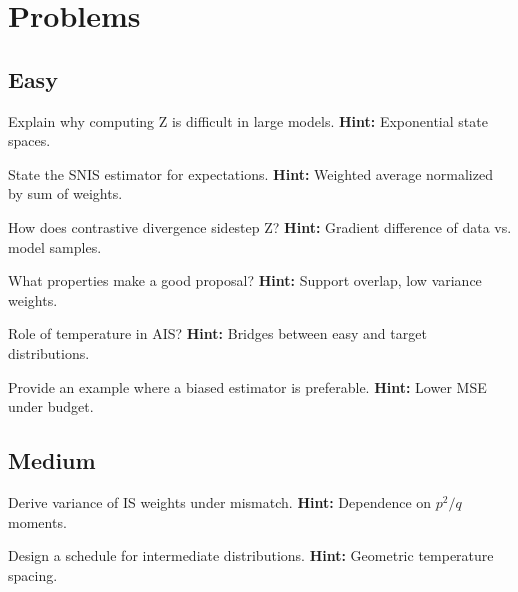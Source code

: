 
\section*{Problems}

\subsection*{Easy}
\begin{problem}
Explain why computing Z is difficult in large models.
\textbf{Hint:} Exponential state spaces.
\end{problem}

\begin{problem}
State the SNIS estimator for expectations.
\textbf{Hint:} Weighted average normalized by sum of weights.
\end{problem}

\begin{problem}
How does contrastive divergence sidestep Z?
\textbf{Hint:} Gradient difference of data vs. model samples.
\end{problem}

\begin{problem}[Proposals]
What properties make a good proposal?
\textbf{Hint:} Support overlap, low variance weights.
\end{problem}

\begin{problem}[Temperature]
Role of temperature in AIS?
\textbf{Hint:} Bridges between easy and target distributions.
\end{problem}

\begin{problem}
Provide an example where a biased estimator is preferable.
\textbf{Hint:} Lower MSE under budget.
\end{problem}

\subsection*{Medium}
\begin{problem}
Derive variance of IS weights under mismatch.
\textbf{Hint:} Dependence on $p^2/q$ moments.
\end{problem}

\begin{problem}
Design a schedule for intermediate distributions.
\textbf{Hint:} Geometric temperature spacing.
\end{problem}

